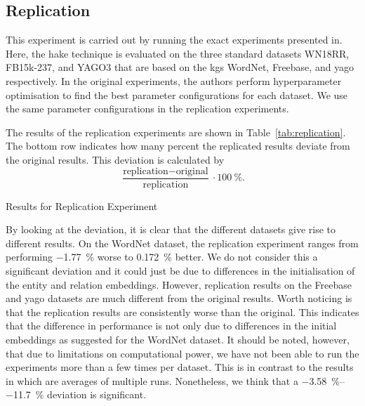 \subsection{Replication}\label{sec:replication}

This experiment is carried out by running the exact experiments presented in\cite{Zhang2019}.
Here, the \ac{hake} technique is evaluated on the three standard datasets WN18RR, FB15k-237, and YAGO3 that are based on the \acp{kg} WordNet, Freebase, and \ac{yago} respectively.
In the original experiments, the authors perform hyperparameter optimisation to find the best parameter configurations for each dataset.
We use the same parameter configurations in the replication experiments.

The results of the replication experiments are shown in Table~\ref{tab:replication}.
The bottom row indicates how many percent the replicated results deviate from the original results.
This deviation is calculated by
\[\frac{\text{replication} - \text{original}}{\text{replication}} \cdot \SI{100}{\percent}.\]

\begin{table*}[ht]
  \centering
  \caption{Results for Replication Experiment}\label{tab:replication}
  
\end{table*}

By looking at the deviation, it is clear that the different datasets give rise to different results.
On the WordNet dataset, the replication experiment ranges from performing \SI{-1.77}{\percent} worse to \SI{0.172}{\percent} better.
We do not consider this a significant deviation and it could just be due to differences in the initialisation of the entity and relation embeddings.
However, replication results on the Freebase and \ac{yago} datasets are much different from the original results.
Worth noticing is that the replication results are consistently worse than the original.
This indicates that the difference in performance is not only due to differences in the initial embeddings as suggested for the WordNet dataset.
It should be noted, however, that due to limitations on computational power, we have not been able to run the experiments more than a few times per dataset.
This is in contrast to the results in\cite{Zhang2019} which are averages of multiple runs.
Nonetheless, we think that a \SIrange{-3.58}{-11.7}{\percent} deviation is significant.
